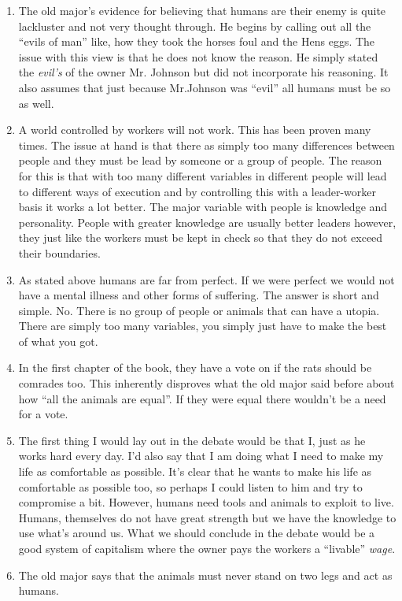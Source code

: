 \documentclass[12pt]{article}
\begin{document}
    \begin{enumerate}
        \item The old major's evidence for believing that humans are their enemy is quite lackluster and not very thought through. He begins by calling out all the ``evils of man'' like, how they took the horses foul and the Hens eggs. The issue with this view is that he does not know the reason. He simply stated the \textit{evil's} of the owner Mr. Johnson but did not incorporate his reasoning. It also assumes that just because Mr.Johnson was ``evil'' all humans must be so as well.
        \item A world controlled by workers will not work. This has been proven many times. The issue at hand is that there as simply too many differences between people and they must be lead by someone or a group of people. The reason for this is that with too many different variables in different people will lead to different ways of execution and by controlling this with a leader-worker basis it works a lot better. The major variable with people is knowledge and personality. People with greater knowledge are usually better leaders however, they just like the workers must be kept in check so that they do not exceed their boundaries.
        \item As stated above humans are far from perfect. If we were perfect we would not have a mental illness and other forms of suffering. The answer is short and simple. No. There is no group of people or animals that can have a utopia. There are simply too many variables, you simply just have to make the best of what you got.
        \item In the first chapter of the book, they have a vote on if the rats should be comrades too. This inherently disproves what the old major said before about how ``all the animals are equal''. If they were equal there wouldn't be a need for a vote.
        \item The first thing I would lay out in the debate would be that I, just as he works hard every day. I'd also say that I am doing what I need to make my life as comfortable as possible. It's clear that he wants to make his life as comfortable as possible too, so perhaps I could listen to him and try to compromise a bit. However, humans need tools and animals to exploit to live. Humans, themselves do not have great strength but we have the knowledge to use what's around us. What we should conclude in the debate would be a good system of capitalism where the owner pays the workers a ``livable'' \textit{wage}.
        \item The old major says that the animals must never stand on two legs and act as humans.
    \end{enumerate}
\end{document}
